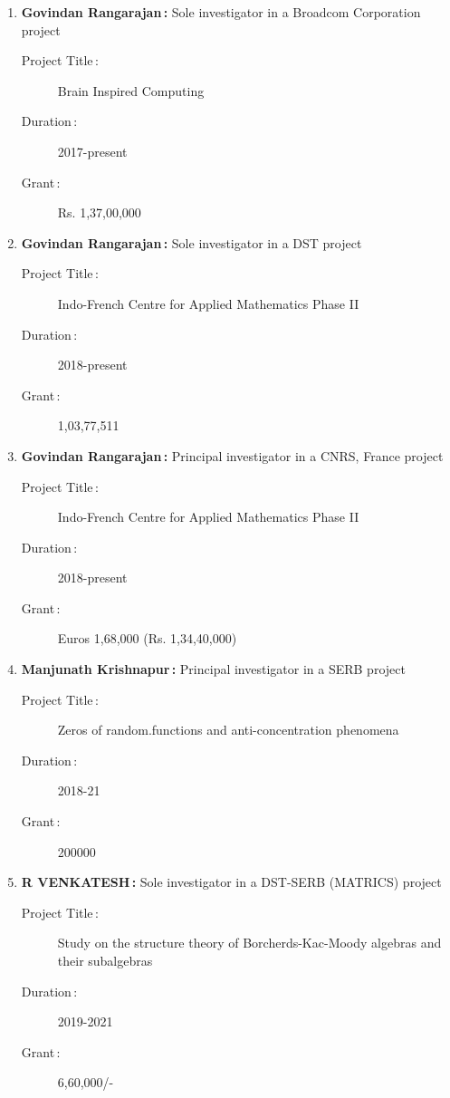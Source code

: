 \begin{enumerate}
\item {\bf Govindan Rangarajan\,:} Sole investigator in a Broadcom Corporation project
\begin{description}
  \item[Project Title\,:] Brain Inspired Computing
  \item[Duration\,:] 2017-present
  \item[Grant\,:] Rs. 1,37,00,000
\end{description}


\item {\bf Govindan Rangarajan\,:} Sole investigator in a DST project
\begin{description}
  \item[Project Title\,:] Indo-French Centre for Applied Mathematics Phase II
  \item[Duration\,:] 2018-present
  \item[Grant\,:] 1,03,77,511
\end{description}


\item {\bf Govindan Rangarajan\,:} Principal investigator in a CNRS, France project
\begin{description}
  \item[Project Title\,:] Indo-French Centre for Applied Mathematics Phase II
  \item[Duration\,:] 2018-present
  \item[Grant\,:] Euros 1,68,000 (Rs. 1,34,40,000)
\end{description}


\item {\bf Manjunath Krishnapur\,:} Principal investigator in a SERB project
\begin{description}
  \item[Project Title\,:] Zeros of random.functions and anti-concentration phenomena
  \item[Duration\,:] 2018-21
  \item[Grant\,:] 200000
\end{description}


\item {\bf R VENKATESH\,:} Sole investigator in a DST-SERB (MATRICS) project
\begin{description}
  \item[Project Title\,:] Study on the structure theory of Borcherds-Kac-Moody algebras and their subalgebras
  \item[Duration\,:] 2019-2021
  \item[Grant\,:] 6,60,000/-
\end{description}



\end{enumerate}
